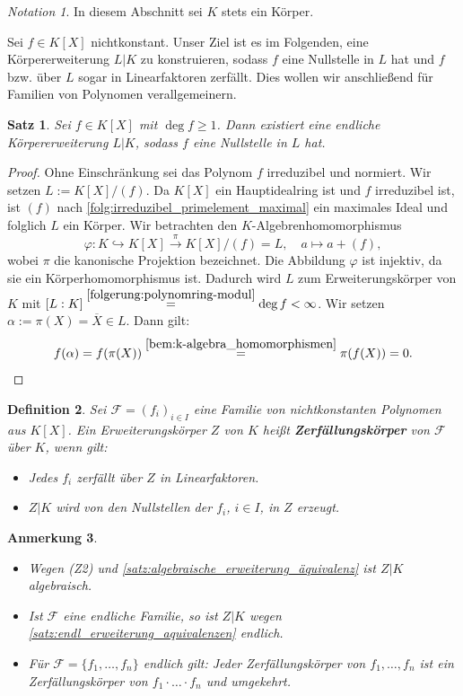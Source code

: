 \documentclass[a4paper, twoside, 11pt, ngerman]{report}
\newcommand{\calF}{\mathcal F}
\theoremstyle{definistyle}
\newtheorem{satz}{Satz}[section]
\newtheorem{defini}[satz]{Definition}
\newtheorem{anm}[satz]{Anmerkung}
\theoremstyle{remark}
\newtheorem*{notation}{Notation}
\newcommand{\defn}[1]{\textit{\bfseries #1}}
\begin{document}
\begin{notation}
In diesem Abschnitt sei $K$ stets ein Körper.  
\end{notation}

Sei $f \in K[X]$ nichtkonstant. Unser Ziel ist es im Folgenden, eine Körpererweiterung $L|K$ zu konstruieren, sodass $f$ eine Nullstelle in $L$ hat und $f$ bzw. über $L$ sogar in Linearfaktoren zerfällt. Dies wollen wir anschließend für Familien von Polynomen verallgemeinern.

\begin{satz}\label{satz:zerfall_poly}
Sei $f \in K[X]$ mit $\deg f \geq 1$. Dann existiert eine endliche Körpererweiterung $L|K$, sodass $f$ eine Nullstelle in $L$ hat.
\end{satz}

\begin{proof}
Ohne Einschränkung sei das Polynom $f$ irreduzibel und normiert. Wir setzen
$L:=K[X]/(f)$. Da $K[X]$ ein Hauptidealring ist und $f$ irreduzibel ist,  ist $(f)$ nach \ref{folg:irreduzibel_primelement_maximal} ein maximales Ideal und folglich $L$ ein Körper.
Wir betrachten den $K$-Algebrenhomomorphismus 
\[
\varphi \colon K\hookrightarrow K[X] \overset{\pi}{\to} K[X]/(f)=L, \quad a \mapsto a + (f),
\]
wobei $\pi$ die kanonische Projektion bezeichnet. Die Abbildung $\varphi$ ist injektiv, da sie ein Körperhomomorphismus ist. Dadurch wird $L$ zum Erweiterungskörper von $K$
mit $[L:K]\overset{\ref{folgerung:polynomring-modul}}{=}\deg f<\infty$. 
Wir setzen $\alpha := \pi(X) = \overline{X}\in L$. Dann gilt:
\[
f(\alpha) = f(\pi(X)) \overset{\ref{bem:k-algebra_homomorphismen}}{=} \pi(f(X)) = 0.
\]
\end{proof}

\begin{defini}\label{def:zerfall_koerper}
Sei $\mathcal{F} = (f_i)_{i \in I}$ eine Familie von nichtkonstanten Polynomen aus $K[X]$. Ein Erweiterungskörper $Z$ von $K$ heißt \defn{Zerfällungskörper} von $\mathcal{F}$ über $K$, wenn gilt:
\begin{itemize}
    \item[(Z1)] Jedes $f_i$ zerfällt über $Z$ in Linearfaktoren.
    \item[(Z2)] $Z|K$ wird von den Nullstellen der $f_i$, $i \in I$, in $Z$ erzeugt.
\end{itemize}
\end{defini}

\begin{anm}\label{anm:zerfkp_produkt}
\begin{itemize}
\item Wegen (Z2) und \ref{satz:algebraische_erweiterung_äquivalenz} ist $Z|K$ algebraisch. 
\item Ist $\calF$ eine endliche Familie, so ist $Z|K$ wegen \ref{satz:endl_erweiterung_aquivalenzen} endlich. 
\item Für $\mathcal{F} = \{f_1, \dots, f_n\}$ endlich gilt: Jeder Zerfällungskörper von $f_1, \dots, f_n$ ist ein Zerfällungskörper von $f_1\cdot\ldots\cdot f_n$ und umgekehrt.
\end{itemize}
\end{anm}
\end{document}
